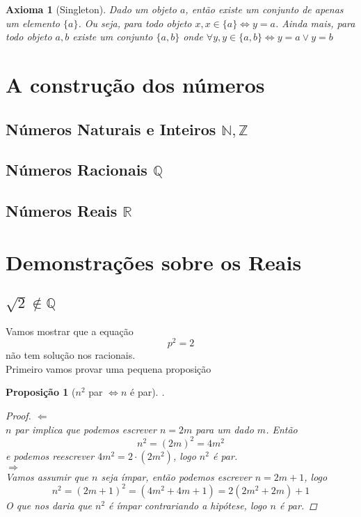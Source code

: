 \documentclass{article}
\newcommand{\NN}{\mathbb{N}}
\newcommand{\QQ}{\mathbb{Q}}
\newcommand{\RR}{\mathbb{R}}
\newcommand{\ZZ}{\mathbb{Z}}
\theoremstyle{plain}
\newtheorem*{prop*}{Proposição}
\newtheorem{axm}{Axioma}
\theoremstyle{remark}
\numberwithin{equation}{section}
\numberwithin{thm}{section}
\numberwithin{defn}{section}
\numberwithin{lemma}{section}
\numberwithin{axm}{section}
\begin{document}
\begin{axm}[Singleton]\label{axm1:3}
Dado um objeto \(a\), então existe um conjunto  de apenas um elemento \(\{a\}\). Ou seja, para todo objeto \(x, x \in \{a\} \iff y = a\). Ainda mais, para todo objeto \(a, b\) existe um conjunto \(\{a,b\}\) onde \(\forall y, y \in \{a,b\} \iff y = a \vee y = b\) 

\end{axm}

\section{A construção dos números}
\subsection{Números Naturais e Inteiros \(\NN, \ZZ\)}

\subsection{Números Racionais \(\QQ\) }

\subsection{Números Reais \(\RR\)}

\section{Demonstrações sobre os Reais}
\subsection{\(\sqrt{2} \notin \QQ\)}
Vamos mostrar que a equação
\[
p^2 = 2 \tag{1} \label{eq}
\]
não tem solução nos racionais.\\
Primeiro vamos provar uma pequena proposição 
\begin{prop*}[\(n^2\) par \(\iff n\) é par].\\
\begin{proof} \(\Leftarrow\)\\
\(n\) par implica que podemos escrever \(n = 2m\) para um dado \(m\). Então
\[n^2 = (2m)^2 = 4m^2\]
e podemos reescrever \(4m^2 = 2\cdot(2m^2)\), logo \(n^2\) é par. \\
\(\Rightarrow\)\\
Vamos assumir que \(n\) seja ímpar, então podemos escrever \(n = 2m+1\), logo
\[
n^2 = (2m+1)^2 = (4m^2 + 4m + 1) = 2(2m^2 + 2m) +1
\]
O que nos daria que \(n^2\) é ímpar contrariando a hipótese, logo \(n\) é par.
\end{proof}
\end{prop*}
\end{document}
